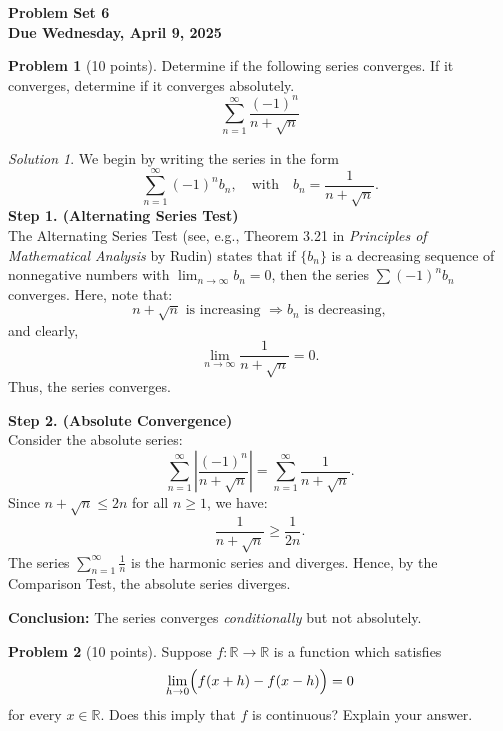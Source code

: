 \documentclass[12pt,oneside]{article}
\theoremstyle{definition}
\newtheorem{problem}{Problem}
\theoremstyle{remark}
\newtheorem*{solution}{Solution}
\begin{document}
\pagestyle{fancy}

\begin{center}
\bf \Large
Problem Set 6 \\[0.5 em]
\large
Due Wednesday, April 9, 2025
\end{center}

\bigskip

\begin{problem}[10 points]
Determine if the following series converges. 
If it converges, determine if it converges absolutely. 
\[
\sum_{n=1}^{\infty} \frac{(-1)^n}{n + \sqrt{n}}
\]
\end{problem}

\begin{solution}
We begin by writing the series in the form 
\[
\sum_{n=1}^{\infty} (-1)^n b_n, \quad \text{with} \quad b_n = \frac{1}{n+\sqrt{n}}.
\]
\textbf{Step 1. (Alternating Series Test)}\\
The Alternating Series Test (see, e.g., Theorem 3.21 in \emph{Principles of Mathematical Analysis} by Rudin) states that if \(\{b_n\}\) is a decreasing sequence of nonnegative numbers with \(\lim_{n\to\infty}b_n=0\), then the series \(\sum (-1)^n b_n\) converges. Here, note that:
\[
n+\sqrt{n} \text{ is increasing } \Longrightarrow b_n \text{ is decreasing},
\]
and clearly,
\[
\lim_{n\to\infty}\frac{1}{n+\sqrt{n}} = 0.
\]
Thus, the series converges.

\medskip
\textbf{Step 2. (Absolute Convergence)}\\
Consider the absolute series:
\[
\sum_{n=1}^{\infty}\left|\frac{(-1)^n}{n+\sqrt{n}}\right| = \sum_{n=1}^{\infty}\frac{1}{n+\sqrt{n}}.
\]
Since \(n+\sqrt{n} \leq 2n\) for all \(n\geq 1\), we have:
\[
\frac{1}{n+\sqrt{n}} \geq \frac{1}{2n}.
\]
The series \(\sum_{n=1}^{\infty}\frac{1}{n}\) is the harmonic series and diverges. Hence, by the Comparison Test, the absolute series diverges.

\medskip
\textbf{Conclusion:} The series converges \emph{conditionally} but not absolutely.
\end{solution}

\begin{problem}[10 points]
Suppose \(f : \mathbb{R} \rightarrow \mathbb{R}\) is a function which satisfies
\[
\lim_{h\rightarrow 0}\Bigl(f(x+h)-f(x-h)\Bigr) = 0
\]
for every \(x\in \mathbb{R}\). 
Does this imply that \(f\) is continuous? Explain your answer. 
\end{problem}
\end{document}
